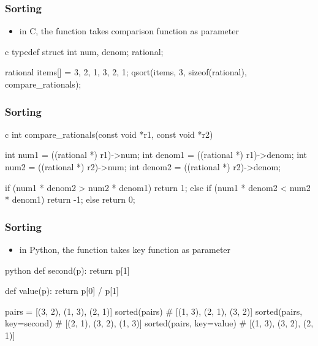 \documentclass[dvipsnames]{beamer}
\theoremstyle{plain}
\begin{document}
\begin{frame}[fragile]
  \frametitle{Sorting}

  \begin{itemize}
    \item in C, the  function takes comparison function as parameter
  \end{itemize}

  \begin{exampleblock}{}
    \begin{pygments}{c}
typedef struct {
    int num, denom;
} rational;

rational items[] = {{3, 2}, {1, 3}, {2, 1}};
qsort(items, 3, sizeof(rational), compare_rationals);
    \end{pygments}
  \end{exampleblock}
\end{frame}

\begin{frame}[fragile]
  \frametitle{Sorting}

  \begin{exampleblock}{}
    \begin{pygments}{c}
int compare_rationals(const void *r1, const void *r2)
{
    int num1 = ((rational *) r1)->num;
    int denom1 = ((rational *) r1)->denom;
    int num2 = ((rational *) r2)->num;
    int denom2 = ((rational *) r2)->denom;

    if (num1 * denom2 > num2 * denom1)
        return 1;
    else if (num1 * denom2 < num2 * denom1)
        return -1;
    else
        return 0;
}
    \end{pygments}
  \end{exampleblock}
\end{frame}

\begin{frame}[fragile]
  \frametitle{Sorting}

  \begin{itemize}
    \item in Python, the  function takes key function
      as parameter
  \end{itemize}

  \begin{exampleblock}{}
    \begin{pygments}{python}
def second(p):
    return p[1]

def value(p):
    return p[0] / p[1]

pairs = [(3, 2), (1, 3), (2, 1)]
sorted(pairs)              # [(1, 3), (2, 1), (3, 2)]
sorted(pairs, key=second)  # [(2, 1), (3, 2), (1, 3)]
sorted(pairs, key=value)   # [(1, 3), (3, 2), (2, 1)]
    \end{pygments}
  \end{exampleblock}
\end{frame}
\end{document}
